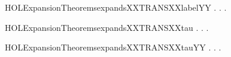 \newcommand{\HOLExpansionTheoremsexpandsXXTRANSXXlabel}{\UseVerbatim{HOLExpansionTheoremsexpandsXXTRANSXXlabel}}
\begin{SaveVerbatim}{HOLExpansionTheoremsexpandsXXTRANSXXlabelYY}
\HOLTokenTurnstile{} \HOLSymConst{\HOLTokenForall{}} .
          \HOLSymConst{\HOLTokenImp{}}
       \HOLSymConst{\HOLTokenForall{}} .
            \HOLTokenTransBegin{} \HOLTokenTransEnd {} \HOLSymConst{\HOLTokenImp{}} \HOLSymConst{\HOLTokenExists{}}.  \HOLTokenWeakTransBegin{} \HOLTokenWeakTransEnd {} \HOLSymConst{\HOLTokenConj{}}   
\end{SaveVerbatim}
\newcommand{\HOLExpansionTheoremsexpandsXXTRANSXXlabelYY}{\UseVerbatim{HOLExpansionTheoremsexpandsXXTRANSXXlabelYY}}
\begin{SaveVerbatim}{HOLExpansionTheoremsexpandsXXTRANSXXtau}
\HOLTokenTurnstile{} \HOLSymConst{\HOLTokenForall{}} .
          \HOLSymConst{\HOLTokenImp{}}
       \HOLSymConst{\HOLTokenForall{}}.
            \HOLTokenTransBegin\HOLConst{\ensuremath{\tau}}\HOLTokenTransEnd {} \HOLSymConst{\HOLTokenImp{}}
              \HOLSymConst{\HOLTokenDisj{}} \HOLSymConst{\HOLTokenExists{}}.  \HOLTokenTransBegin\HOLConst{\ensuremath{\tau}}\HOLTokenTransEnd {} \HOLSymConst{\HOLTokenConj{}}   
\end{SaveVerbatim}
\newcommand{\HOLExpansionTheoremsexpandsXXTRANSXXtau}{\UseVerbatim{HOLExpansionTheoremsexpandsXXTRANSXXtau}}
\begin{SaveVerbatim}{HOLExpansionTheoremsexpandsXXTRANSXXtauYY}
\HOLTokenTurnstile{} \HOLSymConst{\HOLTokenForall{}} .
          \HOLSymConst{\HOLTokenImp{}}
       \HOLSymConst{\HOLTokenForall{}}.  \HOLTokenTransBegin\HOLConst{\ensuremath{\tau}}\HOLTokenTransEnd {} \HOLSymConst{\HOLTokenImp{}} \HOLSymConst{\HOLTokenExists{}}.  \HOLTokenWeakTransBegin\HOLConst{\ensuremath{\tau}}\HOLTokenWeakTransEnd {} \HOLSymConst{\HOLTokenConj{}}   
\end{SaveVerbatim}
